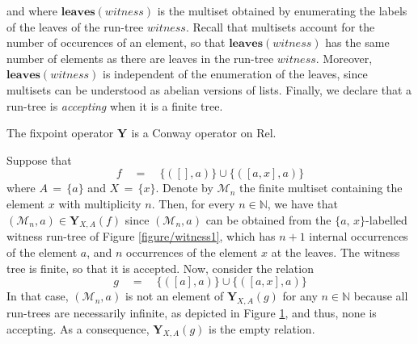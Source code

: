 \documentclass[runningheads,a4paper]{llncs}
\newcommand{\tree}{\textit{witness}}
\newcommand{\leaves}[1]{\textbf{leaves}(#1)}
\newcommand{\fixpoint}[1]{\textbf{Y}_{#1}}
\begin{document}
and where $\leaves{\tree}$ is the multiset obtained by enumerating the labels of the leaves of the run-tree $\tree$. 
Recall that multisets account for the number of occurences of an element, 
so that $\leaves{\tree}$ has the same number of elements as there are leaves
in the run-tree $\tree$.
Moreover, $\leaves{\tree}$ is independent of the enumeration of the leaves, 
since multisets can be understood as abelian versions of lists.
Finally, we declare that a run-tree is \emph{accepting} when it is a finite tree.
\begin{property}
The fixpoint operator $\fixpoint{}$ is a Conway operator on Rel.
\end{property}

\begin{example}
\label{example/witness}
Suppose that 
$$f\quad =\quad \{([],a)\} \cup \{([a,x],a)\}$$
where $A\,=\,\{a\}$ and $X\,=\,\{x\}$. Denote by $\mathcal{M}_n$ the finite multiset containing the element $x$ with multiplicity $n$. 
Then, for every $n \in \mathbb{N}$, we have that $(\mathcal{M}_n,a) \in \fixpoint{X,A}(f)$ 
since $(\mathcal{M}_n,a)$ can be obtained from the $\{a,\,x\}$-labelled witness run-tree 
of Figure \ref{figure/witness1}, which has $n+1$ internal occurrences of the element $a$, 
and $n$ occurrences of the element $x$ at the leaves. The witness tree is finite, so that it is accepted.
Now, consider the relation
$$g\quad =\quad \{([a],a)\} \cup \{([a,x],a)\}$$
In that case, $(\mathcal{M}_n,a)$ is not an element of $\fixpoint{X,A}(g)$ for any $n \in \mathbb{N}$
because all run-trees are necessarily infinite, as depicted in Figure \ref{figure/badwitness}, 
and thus, none is accepting. 
As a consequence, $\fixpoint{X,A}(g)$ is the empty relation.

\begin{figure}[t]
\begin{small}
\centering
\begin{minipage}{.5\textwidth}
  \centering
{}
\label{figure/witness1}
\end{minipage}\begin{minipage}{.5\textwidth}
  \centering
\label{figure/badwitness}
\end{minipage}
\end{small}
\vspace{-0.5cm}
\end{figure}
\end{example}
\end{document}
